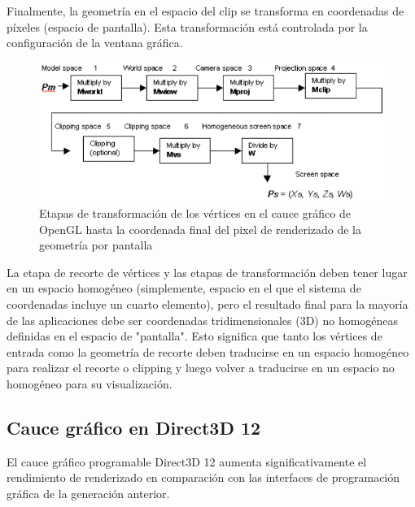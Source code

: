 \documentclass[a4paper, 17pt]{book}
\begin{document}
Finalmente, la geometría en el espacio del clip se transforma en coordenadas de píxeles (espacio de pantalla).
Esta transformación está controlada por la configuración de la ventana gráfica.

\begin{figure}[hbt!]
    \centering
    \includegraphics[scale=0.40, keepaspectratio]{img/d3dxfrm61.png}
    \caption{Etapas de transformación de los vértices en el cauce gráfico de OpenGL hasta la coordenada final
    del pixel de renderizado de la geometría por pantalla}
    \label{figura:khronos}
\end{figure}

La etapa de recorte de vértices y las etapas de transformación deben tener lugar en un espacio homogéneo (simplemente,
espacio en el que el sistema de coordenadas incluye un cuarto elemento), pero el resultado final para la mayoría de
las aplicaciones debe ser coordenadas tridimensionales (3D) no homogéneas definidas en el espacio de "pantalla".
Esto significa que tanto los vértices de entrada como la geometría de recorte deben traducirse en un espacio homogéneo
para realizar el recorte o clipping y luego volver a traducirse en un espacio no homogéneo para su visualización.

\subsection{Cauce gráfico en Direct3D 12} 
\label{subsec:CauceDX12}

El cauce gráfico programable Direct3D 12 aumenta significativamente el rendimiento de renderizado en comparación
con las interfaces de programación gráfica de la generación anterior.
\end{document}
